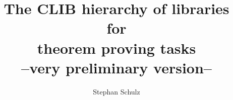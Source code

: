 \documentclass{article}
\author{Stephan Schulz}
\title{The CLIB hierarchy of libraries\\for\\theorem proving
  tasks\\{\small --very preliminary version--}}
\begin{document}
\maketitle{}

\tableofcontents{}






\end{document}
